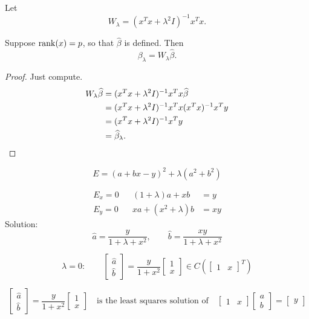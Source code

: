 \documentclass[12pt]{amsart}
\begin{document}
Let
\[
    W_\lambda = (x^Tx + \lambda^2I)^{-1}x^Tx.
\]

\begin{theorem}
    Suppose $\rank(x)=p$, so that $\hat\beta$ is defined. Then
    \[
        \beta_\lambda = W_\lambda\hat\beta.
    \]
\end{theorem}

\begin{proof} Just compute.
    \begin{align*}
        W_\lambda\hat\beta
        &= (x^Tx + \lambda^2I)^{-1}x^Tx\hat\beta\\
        &= (x^Tx + \lambda^2I)^{-1}x^Tx(x^Tx)^{-1}x^T y\\
        &= (x^Tx + \lambda^2I)^{-1}x^T y\\
        &= \hat\beta_\lambda.\qedhere
    \end{align*}
\end{proof}

\[
    E = (a + bx - y)^2 + \lambda(a^2 + b^2)
\]

\begin{align*}
    E_x = 0 && (1 + \lambda)a + xb &= y\\
    E_y = 0 && xa + (x^2+\lambda)b &= xy
\end{align*}
Solution:
\[
    \hat a = \frac y{1+\lambda + x^2},\qquad
    \hat b = \frac {xy}{1+\lambda + x^2}
\]

\[
    \lambda = 0:\qquad \begin{bmatrix}
        \hat a\\\hat b
    \end{bmatrix} = \frac y{1+x^2}\begin{bmatrix}
        1\\x
    \end{bmatrix}\in C\left(\begin{bmatrix}1 & x\end{bmatrix}^T\right)
\]

\[
    \begin{bmatrix}
        \hat a\\\hat b
    \end{bmatrix}
    = \frac y{1+x^2}\begin{bmatrix}
        1\\x
    \end{bmatrix}
    \quad\text{is the least squares solution of}\quad
    \begin{bmatrix}1 & x\end{bmatrix}\begin{bmatrix}
        a\\b
    \end{bmatrix}
    =\begin{bmatrix}
        y
    \end{bmatrix}
\]
\end{document}
